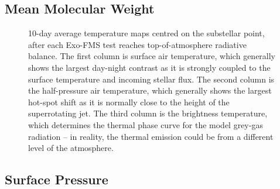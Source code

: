 

\subsection{Mean Molecular Weight}


\begin{figure}
\caption{10-day average temperature maps centred on the substellar point, after each Exo-FMS test reaches top-of-atmosphere radiative balance. The first column is surface air temperature, which generally shows the largest day-night contrast as it is strongly coupled to the surface temperature and incoming stellar flux. The second column is the half-pressure air temperature, which generally shows the largest hot-spot shift as it is normally close to the height of the superrotating jet. The third column is the brightness temperature, which determines the thermal phase curve for the model grey-gas radiation -- in reality, the thermal emission could be from a different level of the atmosphere.\label{fig:allT_results}}
\end{figure}

\subsection{Surface Pressure}


